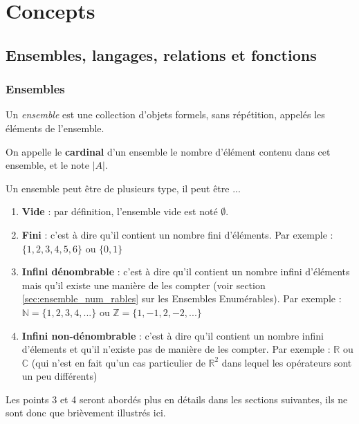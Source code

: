 
\chapter{Concepts}
\label{ch:concepts}

\section{Ensembles, langages, relations et fonctions}
\label{sec:ensembles_langages_relations_et_fonctions}

\subsection{Ensembles}
\label{subsec:ensembles}
\begin{mydef}
    Un \emph{ensemble} est une collection d'objets formels, sans répétition,
    appelés les éléments de l'ensemble.
\end{mydef}
\begin{mydef}\label{def:cardinal}
    On appelle le \textbf{cardinal} d'un ensemble le nombre d'élément contenu dans cet ensemble, et le note $|A|$.
\end{mydef}

\noindent Un ensemble peut être de plusieurs type, il peut être ...
\begin{enumerate}
    \item \textbf{Vide} : par définition, l'ensemble vide est noté $\emptyset$.
    \item \textbf{Fini} : c'est à dire qu'il contient un nombre fini d'éléments. Par exemple : $\{1,2,3,4,5,6\}$ ou $\{0,1\}$
    \item \textbf{Infini dénombrable} : c'est à dire qu'il contient un nombre infini d'éléments mais qu'il existe une manière de les compter (voir section \ref{sec:ensemble_num_rables} sur les Ensembles Enumérables). Par exemple : $ \mathbb{N} = \{1,2,3,4,...\}$ ou $ \mathbb{Z} = \{1,-1,2,-2,...\}$
    \item \textbf{Infini non-dénombrable} : c'est à dire qu'il contient un nombre infini d'élements et qu'il n'existe pas de manière de les compter. Par exemple : $\mathbb{R}$ ou $\mathbb{C}$ (qui n'est en fait qu'un cas particulier de $\mathbb{R}^2$ dans lequel les opérateurs sont un peu différents)
\end{enumerate}
\begin{myrem}
  Les points 3 et 4 seront abordés plus en détails dans les sections suivantes, ils ne sont donc que brièvement illustrés ici.
\end{myrem}

